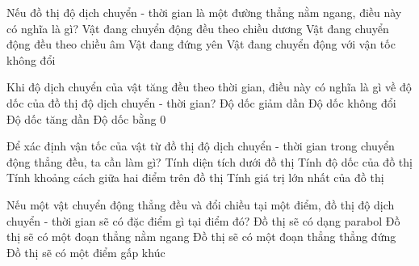 \begin{ex}%
\loigiai{
}
 \end{ex}
\begin{ex}%
Nếu đồ thị độ dịch chuyển - thời gian là một đường thẳng nằm ngang, điều này có nghĩa là gì?
\choice
{Vật đang chuyển động đều theo chiều dương}
{Vật đang chuyển động đều theo chiều âm}
{\True Vật đang đứng yên}
{Vật đang chuyển động với vận tốc không đổi}
\loigiai{

}
\end{ex}
\begin{ex}%
Khi độ dịch chuyển của vật tăng đều theo thời gian, điều này có nghĩa là gì về độ dốc của đồ thị độ dịch chuyển - thời gian?
\choice
{Độ dốc giảm dần}
{\True Độ dốc không đổi}
{Độ dốc tăng dần}
{Độ dốc bằng $0$}
\loigiai{

}
\end{ex}
\begin{ex}%
Để xác định vận tốc của vật từ đồ thị độ dịch chuyển - thời gian trong chuyển động thẳng đều, ta cần làm gì?
\choice
{Tính diện tích dưới đồ thị}
{\True Tính độ dốc của đồ thị}
{Tính khoảng cách giữa hai điểm trên đồ thị}
{Tính giá trị lớn nhất của đồ thị}
\loigiai{

}
\end{ex}
\begin{ex}%
Nếu một vật chuyển động thẳng đều và đổi chiều tại một điểm, đồ thị độ dịch chuyển - thời gian sẽ có đặc điểm gì tại điểm đó?
\choice
{Đồ thị sẽ có dạng parabol}
{Đồ thị sẽ có một đoạn thẳng nằm ngang}
{Đồ thị sẽ có một đoạn thẳng thẳng đứng}
{\True Đồ thị sẽ có một điểm gấp khúc}
\loigiai{

}
\end{ex}
